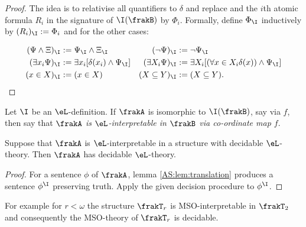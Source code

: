 \begin{proof}
The idea is to relativise all quantifiers to $\delta$ and replace and the $i$th atomic formula $R_i$ in the signature of $\I(\frakB)$ 
by $\Phi_i$.
Formally, define $\Phi_\I$ inductively by $(R_i)_\I := \Phi_i$ and for the other cases:

\begin{align*}
(\Psi \wedge \Xi)_\I & := \Psi_\I \wedge \Xi_\I  					&(\neg \Psi)_\I & := \neg \Psi_\I \\
(\exists x_i \Psi)_\I & := \exists x_i [\delta(x_i) \wedge \Psi_\I]  		&(\exists X_i \Psi)_\I & := \exists X_i [(\forall x \in X_i \delta(x)) \wedge \Psi_\I]\\
(x \in X)_\I &:= (x \in X)  & (X \subseteq Y)_\I &:= (X \subseteq Y) .
\end{align*}
\end{proof}

\begin{definition}
Let $\I$ be an $\eL$-definition. If $\frakA$ is isomorphic to $\I(\frakB)$, say via $f$, then say that {\em $\frakA$ is  $\eL$-interpretable in $\frakB$ via co-ordinate map $f$}.
\end{definition}

\begin{proposition}
Suppose that $\frakA$ is $\eL$-interpretable in a structure with decidable $\eL$-theory. Then $\frakA$ has decidable $\eL$-theory.
\end{proposition}

\begin{proof}
For a sentence $\phi$ of $\frakA$, lemma \ref{AS:lem:translation} produces a sentence $\phi^\I$ preserving truth. 
Apply the given decision procedure to $\phi^\I$. 
\end{proof}

For example  for $r < \omega$ the structure $\frakT_r$ is MSO-interpretable in $\frakT_2$ and consequently the MSO-theory of $\frakT_r$ is decidable.


